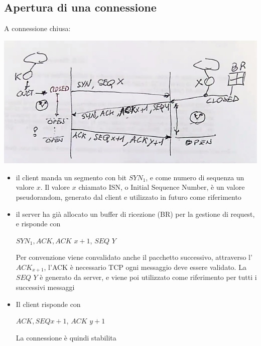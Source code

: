 \documentclass[11pt, oneside]{article}   	%
\begin{document}
\subsection*{Apertura di una connessione}
A connessione chiusa:
\begin{center}
\includegraphics[scale=0.5]{t5}
\end{center}
\begin{itemize}
\item il client manda un segmento con bit $SYN_1$, e come numero di sequenza un valore $x$.
Il valore $x$ chiamato ISN, o Initial Sequence Number, è un valore pseudorandom, generato dal client e utilizzato in futuro come riferimento
\item il server ha già allocato un buffer di ricezione (BR) per la gestione di request, e risponde con \begin{center}
$SYN_1, ACK, ACK$ $x+1$, $SEQ$ $Y$ 
\end{center}
Per convenzione viene convalidato anche il pacchetto successivo, attraverso l'$ACK_{x+1}$, l'ACK è necessario TCP ogni messaggio deve essere validato.
La $SEQ$ $Y$ è generato da server, e viene poi utilizzato come riferimento per tutti i successivi messaggi
\item Il client risponde con \begin{center}

$ACK, SEQ x+1$, $ACK$ $y+1$\\
\end{center}
La connessione è quindi stabilita
\end{itemize}
\end{document}
